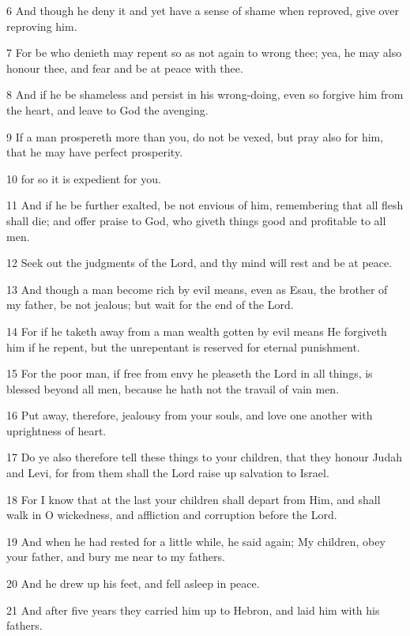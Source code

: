 \par 6 And though he deny it and yet have a sense of shame when reproved, give over reproving him.

\par 7 For be who denieth may repent so as not again to wrong thee; yea, he may also honour thee, and fear and be at peace with thee.

\par 8 And if he be shameless and persist in his wrong-doing, even so forgive him from the heart, and leave to God the avenging.

\par 9 If a man prospereth more than you, do not be vexed, but pray also for him, that he may have perfect prosperity.

\par 10 for so it is expedient for you.

\par 11 And if he be further exalted, be not envious of him, remembering that all flesh shall die; and offer praise to God, who giveth things good and profitable to all men.

\par 12 Seek out the judgments of the Lord, and thy mind will rest and be at peace.

\par 13 And though a man become rich by evil means, even as Esau, the brother of my father, be not jealous; but wait for the end of the Lord.

\par 14 For if he taketh away from a man wealth gotten by evil means He forgiveth him if he repent, but the unrepentant is reserved for eternal punishment.

\par 15 For the poor man, if free from envy he pleaseth the Lord in all things, is blessed beyond all men, because he hath not the travail of vain men.

\par 16 Put away, therefore, jealousy from your souls, and love one another with uprightness of heart.

\par 17 Do ye also therefore tell these things to your children, that they honour Judah and Levi, for from them shall the Lord raise up salvation to Israel.

\par 18 For I know that at the last your children shall depart from Him, and shall walk in O wickedness, and affliction and corruption before the Lord.

\par 19 And when he had rested for a little while, he said again; My children, obey your father, and bury me near to my fathers.

\par 20 And he drew up his feet, and fell asleep in peace.

\par 21 And after five years they carried him up to Hebron, and laid him with his fathers.



